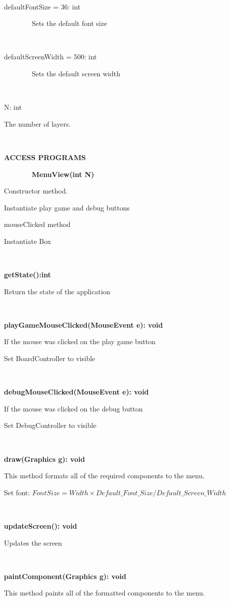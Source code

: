 \documentclass{article}
\begin{document}
{{{~}

{defaultFontSize = 36: int}

{~~~~~~~~Sets the default font size}

{~~~~~~~~}

{defaultScreenWidth = 500: int}

{~~~~~~~~Sets the default screen width}

{~~~~~~~~}

{N: int}

{The number of layers.}

{~~~~~~~~}

{}

{\textbf{ACCESS PROGRAMS}}

{~~~~~~~~\textbf{MenuView(int N)}}

{Constructor method. }

{Instantiate play game and debug buttons}{~~~~~~~~}

{mouseClicked method}

{Instantiate Box}

{~}

{\textbf{getState():int}}

{Return the state of the application}

{~}

{\textbf{playGameMouseClicked(MouseEvent e): void}}

{If the mouse was clicked on the play game button}

{Set BoardController to visible}

{~}

{\textbf{debugMouseClicked(MouseEvent e): void}}

{If the mouse was clicked on the debug button~~~~~~~~}

{Set DebugController to visible}

{~}

{\textbf{draw(Graphics g): void}}

{This method formats all of the required components to the menu. }

{Set font: \(Font Size = Width \times Default\_Font\_Size / Default\_Screen\_Width\)}}

{~~~~~~~~}

{\textbf{updateScreen(): void}}

{Updates the screen}

{~~~~~~~~}

{\textbf{paintComponent(Graphics g): void}}

{This method paints all of the formatted components to the menu.}

}
\end{document}
